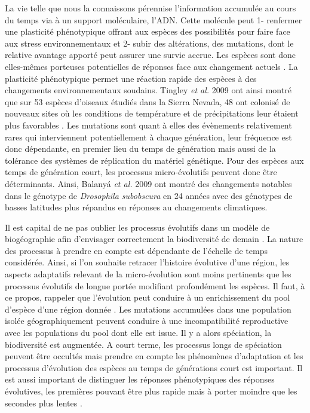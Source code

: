 La vie telle que nous la connaissons pérennise l'information accumulée
au cours du temps via à un support moléculaire, l'ADN. Cette molécule
peut 1- renfermer une plasticité phénotypique offrant aux espèces des
possibilités pour faire face aux stress environnementaux et 2- subir des
altérations, des mutations, dont le relative avantage apporté peut
assurer une survie accrue. Les espèces sont donc elles-mêmes porteuses
potentielles de réponses face aux changement actuels
\cite{Parmesan2006,Lavergne2010}. La plasticité phénotypique permet une
réaction rapide des espèces à des changements environnementaux soudains.
Tingley \textit{et al.} 2009 ont ainsi montré que sur 53 espèces
d'oiseaux étudiés dans la Sierra Nevada, 48 ont colonisé de nouveaux
sites où les conditions de température et de précipitations leur étaient
plus favorables \cite{Tingley2009}. Les mutations sont quant à elles des
évènements relativement rares qui interviennent potentiellement à chaque
génération, leur fréquence est donc dépendante, en premier lieu du temps
de génération mais aussi de la tolérance des systèmes de réplication du
matériel génétique. Pour des espèces aux temps de génération court, les
processus micro-évolutifs peuvent donc être déterminants. Ainsi, Balanyá
\textit{et al.} 2009 ont montré des changements notables dans le
génotype de \textit{Drosophila subobscura} en 24 années avec des
génotypes de basses latitudes plus répandus en réponses au changements
climatiques.

Il est capital de ne pas oublier les processus évolutifs dans un modèle
de biogéographie afin d'envisager correctement la biodiversité de demain
\cite{Sexton2009,Lavergne2010}. La nature des processus à prendre en
compte est dépendante de l'échelle de temps considérée. Ainsi, si l'on
souhaite retracer l'histoire évolutive d'une région, les aspects
adaptatifs relevant de la micro-évolution sont moins pertinents que les
processus évolutifs de longue portée modifiant profondément les espèces.
Il faut, à ce propos, rappeler que l'évolution peut conduire à un
enrichissement du pool d'espèce d'une région donnée
\cite{Rosindell2011,MacArthur1967}. Les mutations accumulées dans une
population isolée géographiquement peuvent conduire à une
incompatibilité reproductive avec les populations du pool dont elle est
issue. Il y a alors spéciation, la biodiversité est augmentée. A court
terme, les processus longs de spéciation peuvent être occultés mais
prendre en compte les phénomènes d'adaptation et les processus
d'évolution des espèces au temps de générations court est important. Il
est aussi important de distinguer les réponses phénotypiques des
réponses évolutives, les premières pouvant être plus rapide mais à
porter moindre que les secondes plus lentes \cite{Gienapp2008}.

